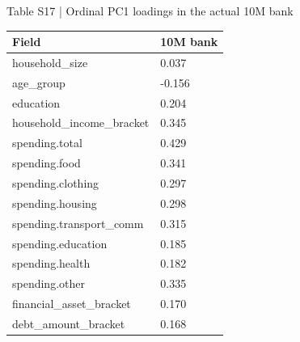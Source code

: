 \documentclass[10pt]{article}
\begin{document}
\begin{center}
\begin{minipage}{\textwidth}
\fontsize{8.5}{10.3}\selectfont
Table S17 | Ordinal PC1 loadings in the actual 10M bank
\par\vspace{4pt}
\begin{tabularx}{\textwidth}{@{}XX@{}}
\toprule
Field & 10M bank \\
\midrule
household\_size & 0.037 \\
age\_group & -0.156 \\
education & 0.204 \\
household\_income\_bracket & 0.345 \\
spending.total & 0.429 \\
spending.food & 0.341 \\
spending.clothing & 0.297 \\
spending.housing & 0.298 \\
spending.transport\_comm & 0.315 \\
spending.education & 0.185 \\
spending.health & 0.182 \\
spending.other & 0.335 \\
financial\_asset\_bracket & 0.170 \\
debt\_amount\_bracket & 0.168 \\
\bottomrule
\end{tabularx}
\par{}
\end{minipage}
\end{center}
\end{document}
